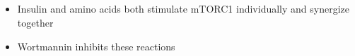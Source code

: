 \documentclass{article}
\begin{document}
	\subsection{\cite{hinalt2004amino}}
	\begin{itemize}
		\item Insulin and amino acids both stimulate mTORC1 individually and synergize together
		\item Wortmannin inhibits these reactions
	\end{itemize}



%
%
%
%
%
%
%
%
\end{document}

